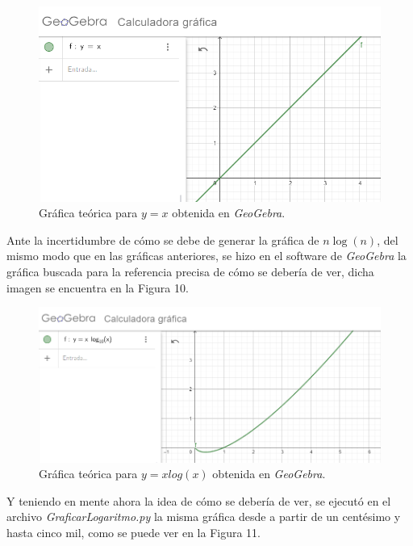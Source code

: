 \documentclass[a4paper,12pt]{article}
\begin{document}
\begin{figure}[H]
    \centering
    \includegraphics[width=.9\textwidth]{media/identidad-geogebra.png}
    \caption{Gráfica teórica para $y=x$ obtenida en \textit{GeoGebra}.\cite{geogebra}}
    \label{fig:identidad-geogebra}
\end{figure}

Ante la incertidumbre de cómo se debe de generar la gráfica de $n\log(n)$, del mismo modo que en las gráficas anteriores, se hizo en el software de \textit{GeoGebra} la gráfica buscada para la referencia precisa de cómo se debería de ver, dicha imagen se encuentra en la Figura 10.

\begin{figure}[h]
    \centering
    \includegraphics[width=.9\textwidth]{media/nlogn-geogebra.png}
    \caption{Gráfica teórica para $y=xlog(x)$ obtenida en \textit{GeoGebra}.\cite{geogebra}}
    \label{fig:nlogn-geogebra}
\end{figure}

Y teniendo en mente ahora la idea de cómo se debería de ver, se ejecutó en el archivo \textit{GraficarLogaritmo.py} la misma gráfica desde a partir de un centésimo y hasta cinco mil, como se puede ver en la Figura 11.
\end{document}
